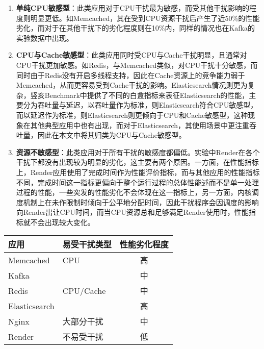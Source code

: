 \begin{enumerate}
    
    \item \textbf{单纯CPU敏感型}：此类应用对于CPU干扰最为敏感，而受其他干扰影响的程度则明显更低。如Memcached，其在受到CPU资源干扰后产生了近50\%的性能劣化，而对于在其他干扰下的劣化程度则在10\%内，同样的情况也在Kafka的实验数据中出现。

    \item \textbf{CPU与Cache敏感型}：此类应用同时受CPU与Cache干扰明显，且通常对CPU干扰更加敏感。如Redis，与Memcached类似，对CPU干扰十分敏感，而同时由于Redis没有开启多线程支持，因此在Cache资源上的竞争能力弱于Memcached，从而更容易受到Cache干扰的影响。Elasticsearch情况则更为复杂，竖亥Benchmark中提供了不同的白盒指标来表征Elasticsearch的性能，主要分为吞吐量与延迟，以吞吐量作为标准，则Elasticsearch符合CPU敏感型，而以延迟作为标准，则Elasticsearch则更倾向于CPU和Cache敏感型，这种现象在其他典型应用中也有出现，而对于Elasticsearch，其使用场景中更注重吞吐量，因此在本文中将其归类为CPU与Cache敏感型。

    \item \textbf{资源不敏感型}：此类应用对于所有干扰的敏感度都偏低。实验中Render在各个干扰下都没有出现较为明显的劣化，这主要有两个原因。一方面，在性能指标上，Render应用使用了完成时间作为性能评价指标，而与其他应用的性能指标不同，完成时间这一指标更偏向于整个运行过程的总体性能述而不是单一处理过程的性能，一些突发的性能劣化不会体现在这一指标上，另一方面，内核调度机制上在未作限制时倾向于公平地分配时间，因此干扰程序会因调度的影响向Render出让CPU时间，而当CPU资源总和足够满足Render使用时，性能指标就不会出现较大变化。

\end{enumerate}

\begin{table}[H]
    \centering
    \footnotesize%
    \setlength{\tabcolsep}{20pt}%
    \renewcommand{\arraystretch}{1.25}%
    \label{tab:interf_sensitivity}
    \begin{tabular}{llc}
        \hline
        应用             & 易受干扰类型 & 性能劣化程度\\
        \hline
        Memcached       & CPU        &  高 \\
	    Kafka           &            &  中 \\
        Redis           & CPU/Cache  &  中 \\
        Elasticsearch   &            &  高 \\
        Nginx           & 大部分干扰   &  中 \\
        Render          & 不易受干扰   &  低 \\
        \hline
    \end{tabular}
\end{table}



